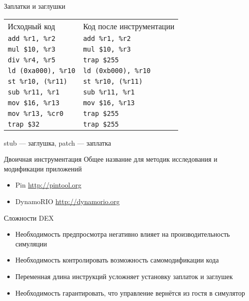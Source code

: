 \documentclass{beamer}
\begin{document}
\begin{frame}{Заплатки и заглушки}
\begin{tabular}{ll}
Исходный код                    &    Код после инструментации \\
\texttt{add \%r1, \%r2}         &    \texttt{add \%r1, \%r2} \\
\texttt{mul \$10, \%r3}         &    \texttt{mul \$10, \%r3} \\
\texttt{div \%r4, \%r5}         &    \texttt{trap \$255} \\
\texttt{ld (0xa000), \%r10}     &    \texttt{ld (0xb000), \%r10} \\
\texttt{st \%r10, (\%r11)}      &    \texttt{st \%r10, (\%r11)} \\
\texttt{sub \%r11, \%r1}        &    \texttt{sub \%r11, \%r1} \\
\texttt{mov \$16, \%r13}        &    \texttt{mov \$16, \%r13} \\
\texttt{mov \%r13, \%cr0}       &    \texttt{trap \$255} \\
\texttt{trap \$32}              &    \texttt{trap \$255} \\
\end{tabular}

\vfill
stub — заглушка, patch — заплатка

\end{frame}

\begin{frame}{Двоичная инструментация}
Общее название для методик исследования и модификации приложений

\begin{itemize}
\item Pin \url{http://pintool.org}
\item DynamoRIO \url{http://dynamorio.org}
\end{itemize}

\end{frame}

\begin{frame}[fragile]{Сложности DEX}

\begin{itemize}
\item Необходимость предпросмотра негативно влияет на производительность симуляции
\item Необходимость контролировать возможность самомодификации кода
\item Переменная длина инструкций усложняет установку заплаток и заглушек
\item Необходимость гарантировать, что управление вернётся из гостя в симулятор
\end{itemize}
\end{frame}
\end{document}
